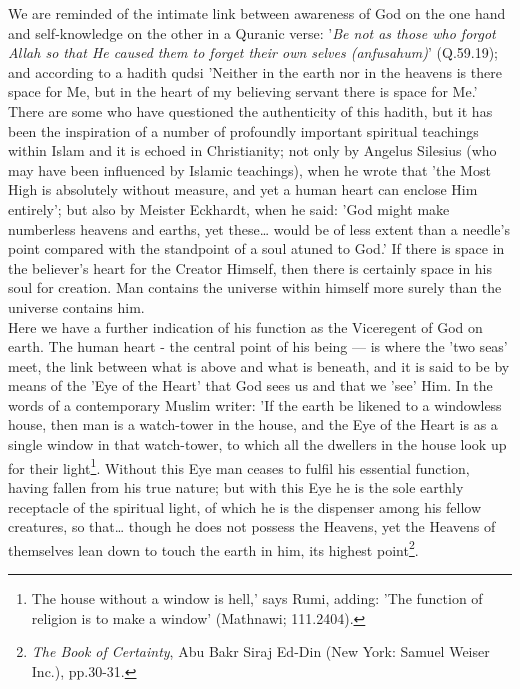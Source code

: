 \documentclass[11pt, b5paper, twoside]{book}
\begin{document}
We are reminded of the intimate link between awareness of God on the one hand and self-knowledge on 
the other in a Quranic verse: '\emph{Be not as those who forgot Allah so that He caused them to forget 
their own selves (anfusahum)}' (Q.59.19); and according to a hadith qudsi 'Neither in the earth nor in 
the heavens is there space for Me, but in the heart of my believing servant there is space for Me.' 
There are some who have questioned the authenticity of this hadith, but it has been the inspiration 
of a number of profoundly important spiritual teachings within Islam and it is echoed in 
Christianity; not only by Angelus Silesius (who may have been influenced by Islamic teachings), when 
he wrote that 'the Most High is absolutely without measure, and yet a human heart can enclose Him 
entirely'; but also by Meister Eckhardt, when he said: 'God might make numberless heavens and earths, 
yet these\ldots{} would be of less extent than a needle's point compared with the standpoint of a soul 
atuned to God.' If there is space in the believer's heart for the Creator Himself, then there is 
certainly space in his soul for creation. Man contains the universe within himself more surely than 
the universe contains him. \\

Here we have a further indication of his function as the Viceregent of God on earth. The human heart 
- the central point of his being --- is where the 'two seas' meet, the link between what is above and 
what is beneath, and it is said to be by means of the 'Eye of the Heart' that God sees us and that we 
'see' Him. In the words of a contemporary Muslim writer: 'If the earth be likened to a windowless 
house, then man is a watch-tower in the house, and the Eye of the Heart is as a single window in that 
watch-tower, to which all the dwellers in the house look up for their light\footnote{The house without a window is hell,' says Rumi, adding: 'The function of religion is to make a 
window' (Mathnawi; 111.2404).}. Without this Eye man 
ceases to fulfil his essential function, having fallen from his true nature; but with this Eye he is 
the sole earthly receptacle of the spiritual light, of which he is the dispenser among his fellow 
creatures, so that\ldots{} though he does not possess the Heavens, yet the Heavens of themselves lean 
down to touch the earth in him, its highest point\footnote{\emph{The Book of Certainty}, Abu Bakr Siraj Ed-Din (New York: Samuel Weiser Inc.), pp.30-31.}.
\end{document}
